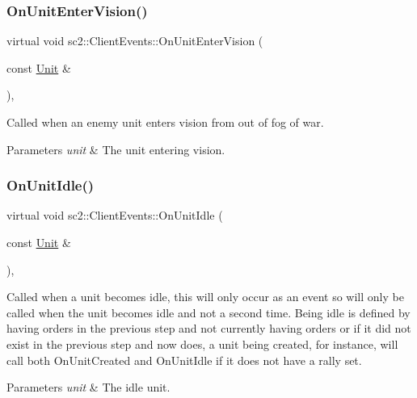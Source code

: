 \subsubsection{\texorpdfstring{On\+Unit\+Enter\+Vision()}{OnUnitEnterVision()}}
{\footnotesize\ttfamily virtual void sc2\+::\+Client\+Events\+::\+On\+Unit\+Enter\+Vision (\begin{DoxyParamCaption}\item[{const \hyperlink{classsc2_1_1_unit}{Unit} \&}]{ }\end{DoxyParamCaption})\hspace{0.3cm}{\ttfamily [inline]}, {\ttfamily [virtual]}}

Called when an enemy unit enters vision from out of fog of war. 
\begin{DoxyParams}{Parameters}
{\em unit} & The unit entering vision. \\
\hline
\end{DoxyParams}
\mbox{\label{classsc2_1_1_client_events_ac1d79ab7cceb688172f375edb2f48f60}} 
\subsubsection{\texorpdfstring{On\+Unit\+Idle()}{OnUnitIdle()}}
{\footnotesize\ttfamily virtual void sc2\+::\+Client\+Events\+::\+On\+Unit\+Idle (\begin{DoxyParamCaption}\item[{const \hyperlink{classsc2_1_1_unit}{Unit} \&}]{ }\end{DoxyParamCaption})\hspace{0.3cm}{\ttfamily [inline]}, {\ttfamily [virtual]}}

Called when a unit becomes idle, this will only occur as an event so will only be called when the unit becomes idle and not a second time. Being idle is defined by having orders in the previous step and not currently having orders or if it did not exist in the previous step and now does, a unit being created, for instance, will call both On\+Unit\+Created and On\+Unit\+Idle if it does not have a rally set. 
\begin{DoxyParams}{Parameters}
{\em unit} & The idle unit. \\
\hline
\end{DoxyParams}
\mbox{\label{classsc2_1_1_client_events_a4cdc022420833b34fbcd1c9713096754}} 
